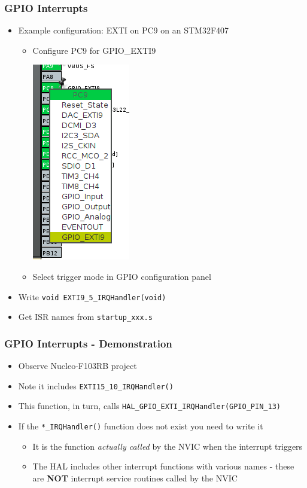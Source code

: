 \documentclass[14pt]{beamer}
\begin{document}
\begin{frame}[fragile]
\frametitle{GPIO Interrupts}
\begin{itemize}
\item Example configuration: EXTI on PC9 on an STM32F407
	\begin{itemize}
		\item Configure PC9 for GPIO\_EXTI9
		\begin{center}
\includegraphics[width=0.15\framewidth]{gpioexti}
\end{center}
		\item Select trigger mode in GPIO configuration panel
	\end{itemize}
\item Write \texttt{void EXTI9\_5\_IRQHandler(void)}
\item Get ISR names from \texttt{startup\_xxx.s}
\end{itemize}
\end{frame}

\begin{frame}[fragile]
\frametitle{GPIO Interrupts - Demonstration}
\begin{itemize}
\item Observe Nucleo-F103RB project
\item Note it includes \texttt{EXTI15\_10\_IRQHandler()}
\item This function, in turn, calls \texttt{HAL\_GPIO\_EXTI\_IRQHandler(GPIO\_PIN\_13)}
\item If the \texttt{*\_IRQHandler()} function does not exist you need to write it
	\begin{itemize}
		\item It is the function \textit{actually called} by the NVIC when the interrupt triggers
		\item The HAL includes other interrupt functions with various names - these are \textbf{NOT} interrupt service routines called by the NVIC
	\end{itemize}
\end{itemize}
\end{frame}
\end{document}
